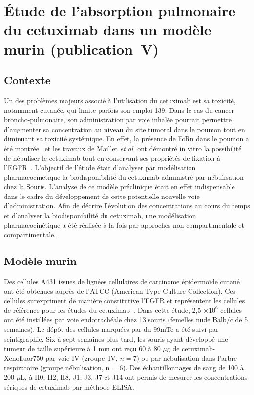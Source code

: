 \section{Étude de l'absorption pulmonaire du cetuximab dans un modèle murin (publication~V)}
\subsection{Contexte}
Un des problèmes majeurs associé à l'utilisation du cetuximab est sa toxicité, notamment cutanée, qui limite parfois son emploi 139. Dans le cas du cancer broncho-pulmonaire, son administration par voie inhalée pourrait permettre d'augmenter sa concentration au niveau du site tumoral dans le poumon tout en diminuant sa toxicité systémique. En effet, la présence de FcRn dans le poumon a été montrée~\citep{REF27} et les travaux de Maillet \textit{et al}. ont démontré in vitro la possibilité de nébuliser le cetuximab tout en conservant ses propriétés de fixation à l'EGFR~\citep{REF140}. L'objectif de l'étude était d'analyser par modélisation pharmacocinétique la biodisponibilité du cetuximab administré par nébulisation chez la Souris. L'analyse de ce modèle préclinique était en effet indispensable dans le cadre du développement de cette potentielle nouvelle voie d'administration. Afin de décrire l'évolution des concentrations au cours du temps et d'analyser la biodisponibilité du cetuximab, une modélisation pharmacocinétique a été réalisée à la fois par approches non-compartimentale et compartimentale. 

\subsection{Modèle murin}
Des cellules A431 issues de lignées cellulaires de carcinome épidermoïde cutané ont été obtenues auprès de l'ATCC (American Type Culture Collection). Ces cellules surexpriment de manière constitutive l'EGFR et représentent les cellules de référence pour les études du cetuximab~\citep{REF141}. Dans cette étude, 2,5 $\times 10^6$ cellules ont été instillées par voie endotrachéale chez 13 souris (femelles nude Balb/c de 5 semaines). Le dépôt des cellules marquées par du 99mTc a été suivi par scintigraphie. Six à sept semaines plus tard, les souris ayant développé une tumeur de taille supérieure à 1 mm ont reçu 60 à 80 $\mu$g de cetuximab-Xenofluor750 par voie \gls{IV} (groupe~IV, $n = 7$) ou par nébulisation dans l'arbre respiratoire (groupe nébulisation, n = 6). Des échantillonnages de sang de 100 à 200 $\mu$L, à H0, H2, H8, J1, J3, J7 et J14 ont permis de mesurer les concentrations sériques de cetuximab par méthode ELISA.
